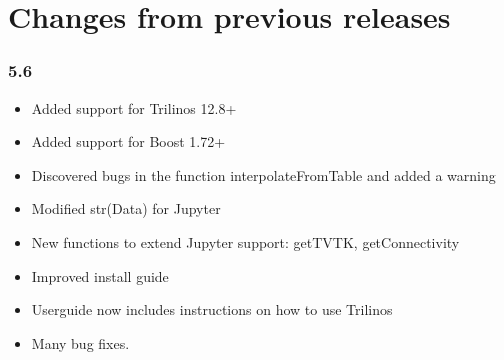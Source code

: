 
%
%
%

\chapter{Changes from previous releases}
\label{app:changes}

\subsection*{5.6}
\begin{itemize}
\item Added support for Trilinos 12.8+
\item Added support for Boost 1.72+
\item Discovered bugs in the function interpolateFromTable and added a warning
\item Modified str(Data) for Jupyter
\item New functions to extend Jupyter support: getTVTK, getConnectivity
\item Improved install guide
\item Userguide now includes instructions on how to use Trilinos
\item Many bug fixes.
\end{itemize}

